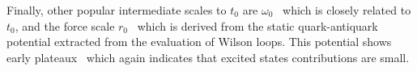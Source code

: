 Finally, other popular intermediate scales to $t_0$ are $\omega_0$~\citep{BMW:2012hcm,Kostrzewa:2021syw,MILC:2015tqx} which is closely related to $t_0$, and the force scale $r_0$~\citep{Sommer:1993ce,Necco:2001xg,Bernard:2000gd} which is derived from the static quark-antiquark potential extracted from the evaluation of Wilson loops. This potential shows early plateaux~\citep{Sommer:2014mea} which again indicates that excited states contributions are small.

